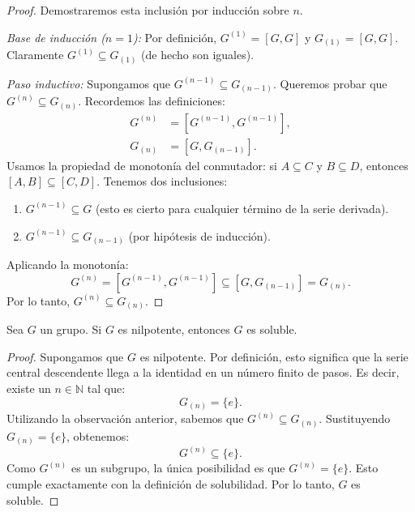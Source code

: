 \begin{proof}
    Demostraremos esta inclusión por inducción sobre $n$.
    
    \textit{Base de inducción ($n=1$):}
    Por definición, $G^{(1)} = [G, G]$ y $G_{(1)} = [G, G]$.
    Claramente $G^{(1)} \subseteq G_{(1)}$ (de hecho son iguales).
    
    \textit{Paso inductivo:}
    Supongamos que $G^{(n-1)} \subseteq G_{(n-1)}$. Queremos probar que $G^{(n)} \subseteq G_{(n)}$.
    Recordemos las definiciones:
    \begin{align*}
        G^{(n)} &= [G^{(n-1)}, G^{(n-1)}], \\
        G_{(n)} &= [G, G_{(n-1)}].
    \end{align*}
    Usamos la propiedad de monotonía del conmutador: si $A \subseteq C$ y $B \subseteq D$, entonces $[A, B] \subseteq [C, D]$.
    Tenemos dos inclusiones:
    \begin{enumerate}
        \item $G^{(n-1)} \subseteq G$ (esto es cierto para cualquier término de la serie derivada).
        \item $G^{(n-1)} \subseteq G_{(n-1)}$ (por hipótesis de inducción).
    \end{enumerate}
    Aplicando la monotonía:
    \begin{equation*}
        G^{(n)} = [G^{(n-1)}, G^{(n-1)}] \subseteq [G, G_{(n-1)}] = G_{(n)}.
    \end{equation*}
    Por lo tanto, $G^{(n)} \subseteq G_{(n)}$.
\end{proof}

\begin{prop}
    Sea $G$ un grupo. Si $G$ es nilpotente, entonces $G$ es soluble.
\end{prop}

\begin{proof}
    Supongamos que $G$ es nilpotente.
    Por definición, esto significa que la serie central descendente llega a la identidad en un número finito de pasos. Es decir, existe un $n \in \mathbb{N}$ tal que:
    \begin{equation*}
        G_{(n)} = \{e\}.
    \end{equation*}
    Utilizando la observación anterior, sabemos que $G^{(n)} \subseteq G_{(n)}$.
    Sustituyendo $G_{(n)} = \{e\}$, obtenemos:
    \begin{equation*}
        G^{(n)} \subseteq \{e\}.
    \end{equation*}
    Como $G^{(n)}$ es un subgrupo, la única posibilidad es que $G^{(n)} = \{e\}$.
    Esto cumple exactamente con la definición de solubilidad.
    Por lo tanto, $G$ es soluble.
\end{proof}


